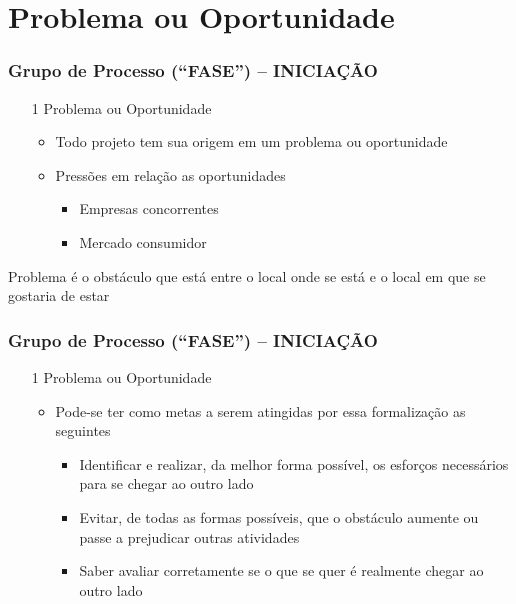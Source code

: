 \section{Problema ou Oportunidade}
\begin{frame}
   \frametitle{Grupo de Processo (“FASE”) – INICIAÇÃO}
   \begin{itemize}
    \item[1] Problema ou Oportunidade
    \begin{itemize}
     \item Todo projeto tem sua origem em um problema ou oportunidade
     \item Pressões em relação as oportunidades
     \begin{itemize}
      \item Empresas concorrentes
      \item Mercado consumidor
     \end{itemize}
    \end{itemize}
   \end{itemize}
  \begin{block}{}
   Problema é o obstáculo que está entre o local onde se está e o local em que se gostaria de estar
  \end{block}
\end{frame}

\begin{frame}
   \frametitle{Grupo de Processo (“FASE”) – INICIAÇÃO}
  \begin{itemize}
    \item[1] Problema ou Oportunidade
   \begin{itemize}
    \item Pode-se ter como metas a serem atingidas por essa formalização as seguintes
    \begin{itemize}
     \item Identificar e realizar, da melhor forma possível, os esforços necessários para se chegar ao outro lado
     \item Evitar, de todas as formas possíveis, que o obstáculo aumente ou passe a prejudicar outras atividades
     \item Saber avaliar corretamente se o que se quer é realmente chegar ao outro lado
    \end{itemize}
   \end{itemize}
   \end{itemize}
   
\end{frame}

